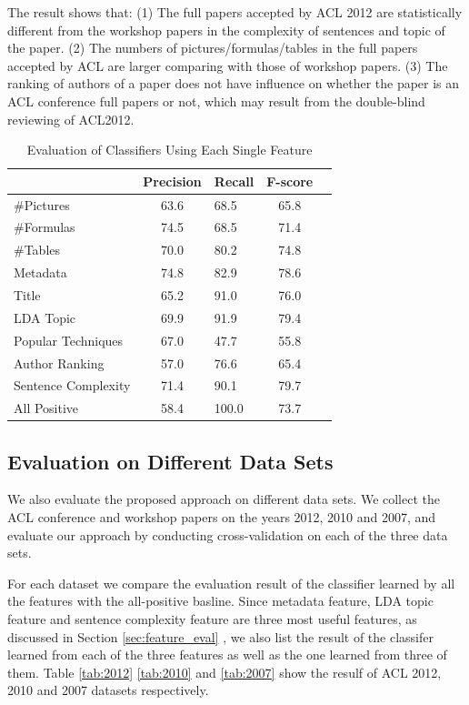 \documentclass[11pt,letterpaper]{article}
\begin{document}
The result shows that:
(1) The full papers accepted by ACL 2012 are statistically 
different from the workshop papers in the complexity of sentences and topic of the paper.
(2) The numbers of pictures/formulas/tables in the full papers accepted by ACL are larger
comparing with those of workshop papers.
(3) The ranking of authors of a paper does not have influence on whether the paper 
is an ACL conference full papers or not, 
which may result from the double-blind reviewing of ACL2012. 

\begin{table}
\begin{center}
\begin{tabular}{|p{2cm}|cl|c|c|}
\hline 
& \bf Precision & \bf Recall & \bf F-score \\ \hline
\#Pictures & 63.6 & 68.5 & 65.8 \\ \hline
\#Formulas	& 74.5	& 68.5	& 71.4\\ \hline
\#Tables	&70.0 &	80.2	& 74.8\\ \hline
Metadata	& 74.8	& 82.9	& 78.6\\ \hline
Title	& 65.2	& 91.0 &	76.0\\ \hline
LDA Topic &	69.9	&91.9&	79.4\\ \hline
Popular Techniques	& 67.0	& 47.7	&55.8\\ \hline
Author Ranking	& 57.0	& 76.6	& 65.4\\ \hline
Sentence Complexity	& 71.4	& 90.1 &	79.7\\ \hline
All Positive	& 58.4	& 100.0	& 73.7\\\hline
\end{tabular}
\end{center}
\label{tab:feature_eval}
\caption{Evaluation of Classifiers Using Each Single Feature}
\end{table}



\subsection{Evaluation on Different Data Sets}
We also evaluate the proposed approach on different data sets.
We collect the ACL conference and workshop papers on the years 2012, 2010 and 2007,
and evaluate our approach by conducting cross-validation on each of the three data sets.

For each dataset we compare the evaluation result of the classifier learned by all the features with the all-positive basline.
Since metadata feature, LDA topic feature and sentence complexity feature are three most useful features, as discussed in Section \ref{sec:feature_eval}
, we also list the result of the classifer learned from each of the three features as well as the one learned from three of them. 
Table \ref{tab:2012} \ref{tab:2010} and \ref{tab:2007} show the resulf of ACL 2012, 2010 and 2007 datasets respectively.
\end{document}
